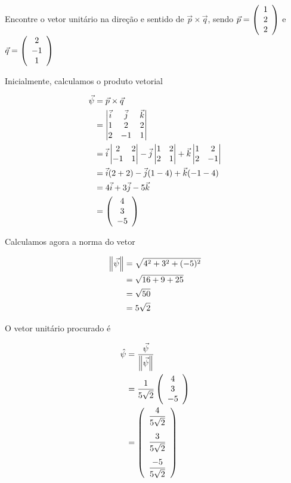 \documentclass[a4paper,12pt,fleqn]{article}
\begin{document}
Encontre o vetor unitário na direção e sentido de
\(
  \vec{p}\times\vec{q}
\), sendo
\(
  \vec{p} = \left(\begin{array}{c} 1 \\ 2 \\ 2 \end{array}\right)
\) e
\(
  \vec{q} = \left(\begin{array}{c} 2 \\ -1 \\ 1 \end{array}\right)
\)

\begin{answer}
  Inicialmente, calculamos o produto vetorial

  \begin{align*}
    \vec{\psi}
    & = \vec{p}\times\vec{q}
    \\
    & = \begin{vmatrix}
          \vec{i} & \vec{j} & \vec{k} \\
          1       & 2       & 2       \\
          2       & -1      & 1
        \end{vmatrix}
    \\
    & = \vec{i}
        \begin{vmatrix}
          2 & 2 \\
          -1 & 1
        \end{vmatrix}
      - \vec{j}
        \begin{vmatrix}
          1 & 2 \\
          2 & 1
        \end{vmatrix}
      + \vec{k}
        \begin{vmatrix}
          1 & 2 \\
          2 & -1
        \end{vmatrix}
    \\
    & = \vec{i}(2+2)
      - \vec{j}(1-4)
      + \vec{k}(-1-4)
    \\
    & = 4\vec{i}+3\vec{j}-5\vec{k}
    \\
    & = \left(\begin{array}{c} 4 \\ 3 \\ -5 \end{array}\right)
  \end{align*}

  Calculamos agora a norma do vetor

  \begin{align*}
    \norm{\vec{\psi}}
    & = \sqrt{4^2+3^2+(-5)^2}
    \\
    & = \sqrt{16+9+25}
    \\
    & = \sqrt{50}
    \\
    & = 5\sqrt{2}
  \end{align*}

  O vetor unitário procurado é

  \begin{align*}
    \hat{\psi}
    & = \frac{\vec{\psi}}{\norm{\vec{\psi}}}
    \\
    & = \frac{1}{5\sqrt{2}}\vetortri{4}{3}{-5}
    \\
    & = \Vetortri{
          \frac{4}{5\sqrt{2}}
        }{
          \frac{3}{5\sqrt{2}}
        }{
          \frac{-5}{5\sqrt{2}}
        }
  \end{align*}
\end{answer}

\end{document}
